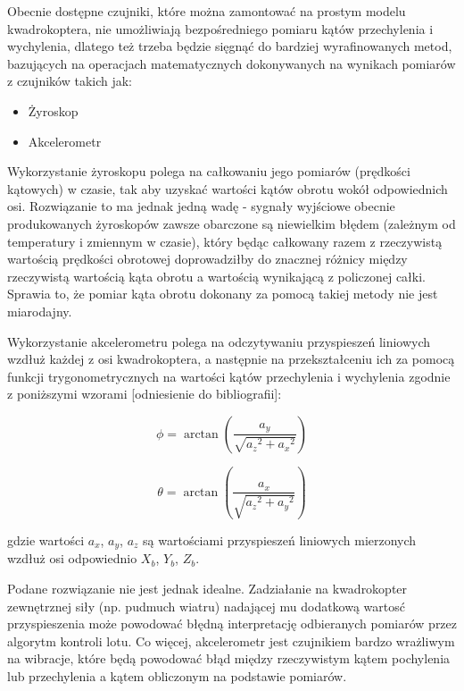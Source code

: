 Obecnie dostępne czujniki, które można zamontować na prostym modelu kwadrokoptera, nie umożliwiają bezpośredniego pomiaru kątów przechylenia i wychylenia, dlatego też trzeba będzie sięgnąć do bardziej wyrafinowanych metod, bazujących na operacjach matematycznych dokonywanych na wynikach pomiarów z czujników takich jak:

\begin{itemize}
	\item Żyroskop
	\item Akcelerometr
\end{itemize} 

Wykorzystanie żyroskopu polega na całkowaniu jego pomiarów (prędkości kątowych) w czasie, tak aby uzyskać wartości kątów obrotu wokół odpowiednich osi. Rozwiązanie to ma jednak jedną wadę - sygnały wyjściowe obecnie produkowanych  żyroskopów zawsze obarczone są niewielkim błędem (zależnym od temperatury i zmiennym w czasie), który będąc całkowany razem z rzeczywistą wartością prędkości obrotowej doprowadziłby do znacznej różnicy między rzeczywistą wartością kąta obrotu a wartością wynikającą z policzonej całki. Sprawia to, że pomiar kąta obrotu dokonany za pomocą takiej metody nie jest miarodajny.

Wykorzystanie akcelerometru polega na odczytywaniu przyspieszeń liniowych wzdłuż każdej z osi kwadrokoptera, a następnie na przekształceniu ich za pomocą funkcji trygonometrycznych na wartości kątów przechylenia i wychylenia zgodnie z poniższymi wzorami [odniesienie do bibliografii]:

\begin{equation}
	\phi = \arctan(\frac{a_y}{\sqrt{a{_z}^2 + a{_x}^2}})
\end{equation}

\begin{equation}
	\theta = \arctan(\frac{a_x}{\sqrt{a{_z}^2 + a{_y}^2}})
\end{equation}

gdzie wartości $a_x$, $a_y$, $a_z$ są wartościami przyspieszeń liniowych mierzonych wzdłuż osi odpowiednio $X_b$, $Y_b$, $Z_b$.

Podane rozwiązanie nie jest jednak idealne. Zadziałanie na kwadrokopter zewnętrznej siły (np. pudmuch wiatru) nadającej mu dodatkową wartosć przyspieszenia może powodować błędną interpretację odbieranych pomiarów przez algorytm kontroli lotu. Co więcej, akcelerometr jest czujnikiem bardzo wrażliwym na wibracje, które będą powodować błąd między rzeczywistym kątem pochylenia lub przechylenia a kątem obliczonym na podstawie pomiarów.


